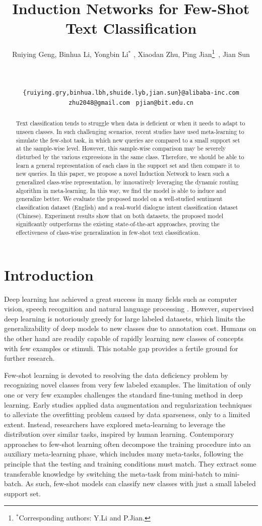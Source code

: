 \documentclass[11pt,a4paper]{article}
\title{Induction Networks for Few-Shot Text Classification}
\author{
  Ruiying Geng\affmark[1,2], Binhua Li\affmark[2], Yongbin Li\affmark[2]$^*$ , Xiaodan Zhu\affmark[3], Ping Jian\affmark[1]\thanks{$^*$Corresponding authors: Y.Li and P.Jian.}\ , Jian Sun\affmark[2]\\
\affaddr{\affmark[1]School of Computer Science and Technology, Beijing Institute of Technology}\\
 \affaddr{\affmark[2] Alibaba Group, Beijing}\\
   \affaddr{\affmark[3] ECE, Queen's University}\\
{\tt \{ruiying.gry,binhua.lbh,shuide.lyb,jian.sun\}@alibaba-inc.com}\\
    {\tt zhu2048@gmail.com    }      {\tt pjian@bit.edu.cn} \\
}
\date{}
\begin{document}
\maketitle


\begin{abstract}
Text classification tends to struggle when data is deficient or when it needs to adapt to unseen classes. In such challenging scenarios, recent studies have used meta-learning to simulate the few-shot task, in which new queries are compared to a small support set at the sample-wise level. However, this sample-wise comparison may be severely disturbed by the various expressions in the same class. Therefore, we should be able to learn a general representation of each class in the support set and then compare it to new queries. In this paper, we propose a novel Induction Network to learn such a generalized class-wise representation, by innovatively leveraging the dynamic routing algorithm in meta-learning. In this way, we find the model is able to induce and generalize better. We evaluate the proposed model on a well-studied sentiment classification dataset (English) and a real-world dialogue intent classification dataset (Chinese). Experiment results show that on both datasets, the proposed model significantly outperforms the existing state-of-the-art approaches, proving the effectiveness of class-wise generalization in few-shot text classification.
\end{abstract}

\section{Introduction}
Deep learning has achieved a great success in many fields such as computer vision, speech recognition and natural language processing \citep{kuang2018attention}. 
However, supervised deep learning is notoriously greedy for large labeled datasets, which limits the generalizability of deep models to new classes due to annotation cost. 
Humans on the other hand are readily capable of rapidly learning new classes of concepts with few examples or stimuli. This notable gap provides a fertile ground for further research.


Few-shot learning is devoted to resolving the data deficiency problem by recognizing novel classes from very few labeled examples. The limitation of only one or very few examples challenges the standard fine-tuning method in deep learning. Early studies \citep{salamon2017deep} applied data augmentation and regularization techniques to alleviate the overfitting problem caused by data sparseness, only to a limited extent. Instead, researchers have explored meta-learning \citep{finn2017model} to leverage the distribution over similar tasks, inspired by human learning. Contemporary approaches to few-shot learning often decompose the training procedure into an auxiliary meta-learning phase, which includes many meta-tasks, following the principle that the testing and training conditions must match. They extract some transferable knowledge by switching the meta-task from mini-batch to mini-batch. As such, few-shot models can classify new classes with just a small labeled support set.
\end{document}
